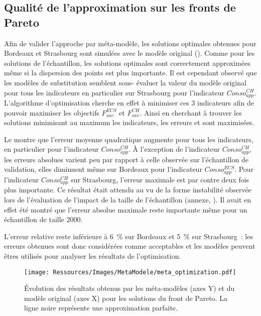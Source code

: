 \subsection{Qualité de l’approximation sur les fronts de Pareto} %
\label{sub:qualite_de_l_approximation_sur_les_fronts_de_pareto}
Afin de valider l’approche par méta-modèle, les solutions optimales obtenues pour Bordeaux
et Strasbourg sont simulées avec le modèle original ().
Comme pour les solutions de l’échantillon, les solutions optimales sont correctement
approximées même si la dispersion des points est plus importante. Il est cependant
observé que les modèles de substitution semblent sous- évaluer la valeur du modèle
original pour tous les indicateurs en particulier sur Strasbourg pour l’indicateur
$Conso_{app}^{CH}$. L’algorithme d’optimisation cherche en effet à minimiser ces $3$
indicateurs afin de pouvoir maximiser les objectifs $F_{sav}^{ECS}$ et $F_{sav}^{CH}$.
Ainsi en cherchant à trouver les solutions minimisant au maximum les indicateurs, les
erreurs  et  sont maximisées.

Le  montre que l’erreur moyenne quadratique augmente pour
tous les indicateurs, en particulier pour l’indicateur $Conso_{app}^{CH}$. À l’exception
de l’indicateur $Conso_{app}^{CH}$, les erreurs absolues varient peu par rapport à celle
observée sur l’échantillon de validation, elles diminuent même sur Bordeaux pour
l’indicateur $Conso_{app}^{ECS}$. Pour l’indicateur $Conso_{app}^{CH}$ sur Strasbourg,
l’erreur maximale est par contre deux fois plus importante. Ce résultat était attendu au
vu de la forme instabilité observée lors de l’évaluation de l’impact de la taille de
l’échantillon (annexe, ). Il avait en effet été montré que l’erreur
absolue maximale reste importante même pour un échantillon de taille $2000$.

L’erreur relative reste inférieure à \SI{6}{\percent} sur Bordeaux et
\SI{5}{\percent} sur Strasbourg~: les erreurs obtenues sont donc considérées
comme acceptables et les modèles peuvent êtres utilisés pour analyser les résultats de
l’optimisation.


\begin{figure}
    \centering
    \texttt{[image: Ressources/Images/MetaModele/meta\_optimization.pdf]}
    \caption[Évaluation de la précision des méta-modèles pour les solutions optimales]
            {Évolution des résultats obtenus par les méta-modèles (axes Y) et du modèle
             original (axes X) pour les solutions du front de Pareto.
             La ligne noire représente une approximation parfaite.}
    \label{fig:validite_meta_ssc_optimisation}
\end{figure}


